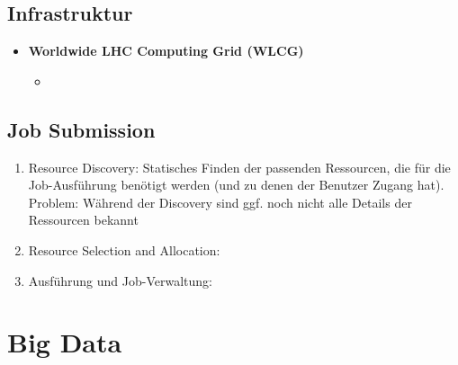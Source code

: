 \subsection{Infrastruktur}
\begin{itemize}
	\item \textbf{Worldwide LHC Computing Grid (WLCG)} %
	\begin{itemize}
		\item 
	\end{itemize}
\end{itemize}


\subsection{Job Submission}
\begin{enumerate}
	\item Resource Discovery: Statisches Finden der passenden Ressourcen, die für die Job-Ausführung benötigt werden (und zu denen der Benutzer Zugang hat). Problem: Während der Discovery sind ggf. noch nicht alle Details der Ressourcen bekannt
	\item Resource Selection and Allocation:
	\item Ausführung und Job-Verwaltung:
\end{enumerate}



\section{Big Data}

